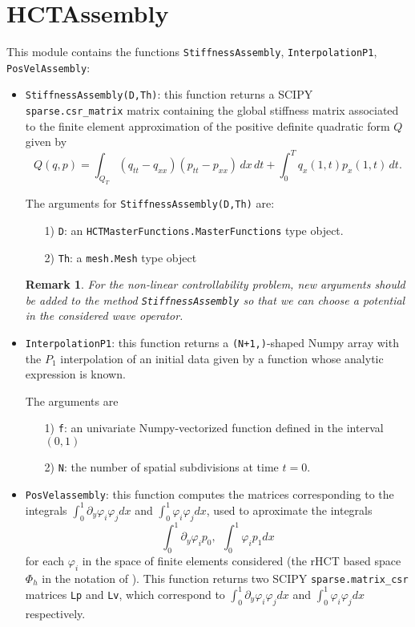 \documentclass{amsart}
\theoremstyle{plain}
\newtheorem{remark}{Remark}
\theoremstyle{definition}
\theoremstyle{remark}
\numberwithin{equation}{section}
\begin{document}
\section{HCTAssembly}

This module contains the functions \verb|StiffnessAssembly|, \verb|InterpolationP1|, \verb|PosVelAssembly|:


\begin{itemize}
\item \verb|StiffnessAssembly(D,Th)|:  this function returns a SCIPY \verb|sparse.csr_matrix| matrix containing the global stiffness matrix associated to the finite element approximation of the positive definite quadratic form $Q$ given by
$$Q(q,p)=\int_{Q_T}(q_{tt}-q_{xx})(p_{tt}-p_{xx})\,dx\,dt+\int_0^Tq_x(1,t)p_x(1,t)\,dt. $$

The arguments for \verb|StiffnessAssembly(D,Th)| are:
\begin{itemize}
\item[1)] \verb|D|: an \verb|HCTMasterFunctions.MasterFunctions| type object.
\item[2)] \verb|Th|: a \verb|mesh.Mesh| type object
\end{itemize}

\begin{remark}
For the non-linear controllability problem, new arguments should be added to
the method \verb|StiffnessAssembly| so that we can choose a potential in the considered wave
operator.
\end{remark}

\item \verb|InterpolationP1|: this function returns a \verb|(N+1,)|-shaped Numpy array with the $P_1$ interpolation of an initial data given by a
function whose analytic expression is known.

The arguments are
\begin{itemize}
\item[1)] \verb|f|: an univariate  Numpy-vectorized function defined in the interval $(0,1)$
\item[2)] \verb|N|: the number of spatial subdivisions at time $t=0$.

\end{itemize}


\item \verb|PosVelassembly|: this function computes the matrices corresponding to the integrals
$\int_0^1 \partial_y\varphi_i \varphi_jdx$ and $\int_0^1 \varphi_i \varphi_jdx$, used to aproximate
the integrals
$$\int_0^1 \partial_y\varphi_i p_0,\ \ \int_0^1 \varphi_i p_1dx$$
for each $\varphi_i$ in the space of finite elements considered (the rHCT based space $\Phi_h$ in the notation of \cite{CindeaMunch}). This function returns two SCIPY \verb|sparse.matrix_csr| matrices \verb|Lp| and \verb|Lv|, which correspond to $\int_0^1 \partial_y\varphi_i \varphi_jdx$ and $\int_0^1 \varphi_i \varphi_jdx$ respectively.
\end{itemize}
\end{document}
